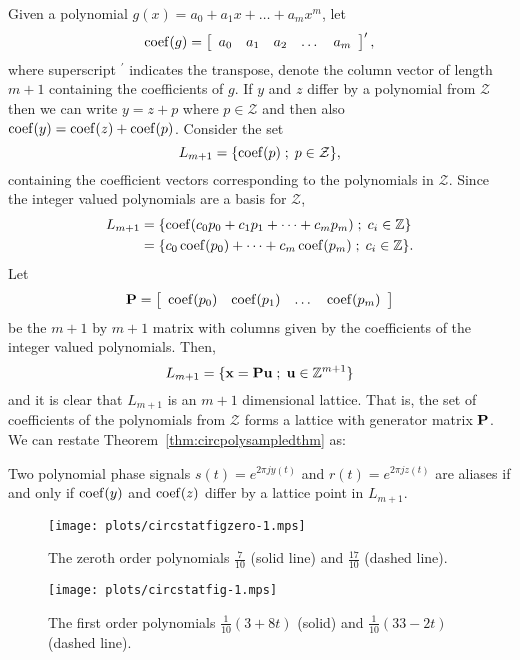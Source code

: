 \documentclass[journal]{IEEEtran}
\begin{document}
Given a polynomial $g(x) = a_0 + a_1x + \dots + a_m x^m$, let
\[
\operatorname{coef}(g) = \left[ \begin{array}{ccccc} a_0 & a_1 & a_2 & \dots & a_m \end{array} \right]^\prime,
\]
where superscript $^\prime$ indicates the transpose, denote the column vector of length $m+1$ containing the coefficients of $g$.  If $y$ and $z$ differ by a polynomial from $\mathcal{Z}$ then we can write $y = z + p$ where $p \in \mathcal{Z}$ and then also $\operatorname{coef}(y) = \operatorname{coef}(z) + \operatorname{coef}(p)$.
  Consider the set
\[
L_{m+1} = \{ \operatorname{coef}(p) \; ; \; p \in \mathcal{Z} \},
\]
containing the coefficient vectors corresponding to the polynomials in $\mathcal{Z}$.  Since the integer valued polynomials are a basis for $\mathcal{Z}$,
\begin{align*}
L_{m+1} &= \{ \operatorname{coef}(c_0 p_0 + c_1p_1 + \dots + c_mp_m) \; ; \; c_i \in {\mathbb Z} \} \\
&= \{ c_0 \operatorname{coef}(p_0) + \dots + c_m\operatorname{coef}(p_m) \; ; \; c_i \in {\mathbb Z} \}.
\end{align*}
Let
\[
\mathbf{P} = \left[ \begin{array}{cccc} \operatorname{coef}(p_0)& \operatorname{coef}(p_1)& \dots& \operatorname{coef}(p_m)  \end{array} \right]
\]
be the $m+1$ by $m+1$ matrix with columns given by the coefficients of the integer valued polynomials.  Then,
\[
L_{m+1} = \{ \mathbf{x} = \mathbf{P}\mathbf{u} \; ; \; \mathbf{u} \in {\mathbb Z}^{m+1} \}
\]
and it is clear that $L_{m+1}$ is an $m+1$ dimensional lattice.  That is, the set of coefficients of the polynomials from $\mathcal{Z}$ forms a lattice with generator matrix $\mathbf{P}$. We can restate Theorem~\ref{thm:circpolysampledthm} as:
\begin{corollary}\label{cor:circpolysampledcoef}
Two polynomial phase signals $s(t) = e^{2\pi j y(t)}$  and $r(t) = e^{2\pi j z(t)}$ are aliases if and only if $\operatorname{coef}(y)$ and $\operatorname{coef}(z)$ differ by a lattice point in $L_{m+1}$.
\end{corollary}

\begin{figure}[p]
	\centering
		\texttt{[image: plots/circstatfigzero-1.mps]}
		\caption{The zeroth order polynomials $\tfrac{7}{10}$ (solid line) and $\tfrac{17}{10}$ (dashed line).}		
\label{fig:circstatplot_zero}
\end{figure}

\begin{figure}[p]
	\centering
		\texttt{[image: plots/circstatfig-1.mps]}
		\caption{The first order polynomials $\tfrac{1}{10}(3 + 8t)$ (solid) and $\tfrac{1}{10}(33 - 2t)$ (dashed line).}
		\label{fig:circstatplot_line}
\end{figure}
\end{document}
